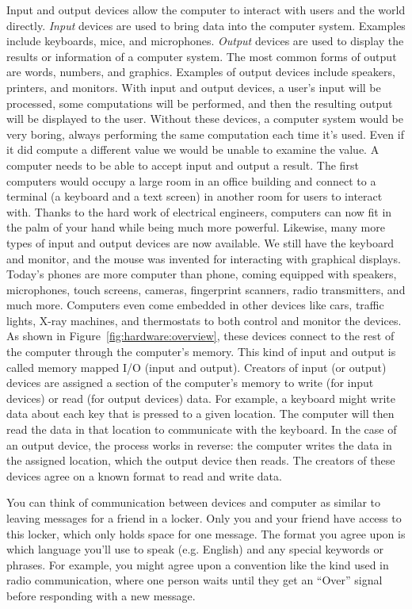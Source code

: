 Input and output  devices allow the computer to interact with users and the world
directly.  \emph{Input} devices are used to bring data into the computer system. Examples include keyboards, mice, and microphones. \emph{Output} devices are used to display the results or information of a computer system. The most common forms of output are words, numbers, and graphics.  Examples of output devices include speakers, printers, and monitors. With input and output devices, a
user's input will be processed, some computations will be performed, and then
the resulting output will be displayed to the user. Without these devices, a computer system would be very boring, always
performing the same computation each time it's used. Even if it did compute a
different value we would be unable to examine the value. A computer needs to be
able to accept input and output a result. The first computers would occupy a
large room in an office building and connect to a terminal (a keyboard and a
text screen) in another room for users to interact with. Thanks to the hard work
of electrical engineers,
computers can now fit in the palm of your hand while being much more powerful.
Likewise, many more types of input and output devices are now available. We
still have the keyboard and monitor, and the mouse was invented for interacting
with graphical displays. Today's phones are more computer than phone, coming
equipped with speakers, microphones, touch screens, cameras, fingerprint
scanners, radio transmitters, and much more. Computers even come embedded in
other devices like cars, traffic lights, X-ray machines, and thermostats to both
control and monitor the devices. As shown in Figure~\ref{fig:hardware:overview},
these devices connect to the rest of the computer through the computer's memory.
This kind of input and output is called memory mapped I/O (input and output).
Creators of input (or output) devices are assigned a section of the computer’s memory to write (for input devices) or read (for output devices) data. For example, a keyboard might write data about each key that is pressed to a given location. The computer will then read the data in that location to communicate with the keyboard. In the case of an output device, the process works in reverse: the computer writes the data in the assigned location, which the output device then reads. The creators of these devices agree on a known format to read and write data.

\begin{example}
  You can think of communication between devices and computer as similar to
  leaving messages for a friend in a locker. Only you and your friend have
  access to this locker, which only holds space for one message. The format you
  agree upon is which language you'll use to speak (e.g. English) and any
  special keywords or phrases. For example, you might agree upon a convention
  like the kind used in radio communication, where one person waits until they
  get an ``Over'' signal before responding with a new message.
\end {example}

